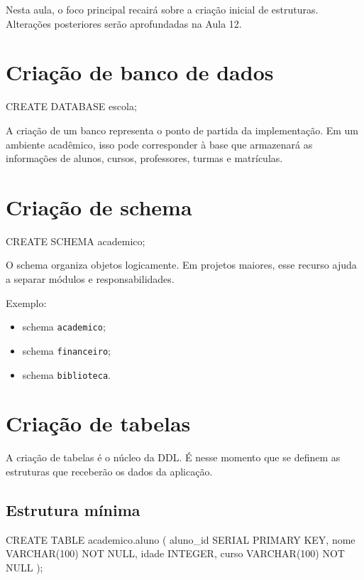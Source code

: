 Nesta aula, o foco principal recairá sobre a criação inicial de estruturas. Alterações posteriores serão aprofundadas na Aula 12.

\section{Criação de banco de dados}

\begin{sqlcode}
CREATE DATABASE escola;
\end{sqlcode}

A criação de um banco representa o ponto de partida da implementação. Em um ambiente acadêmico, isso pode corresponder à base que armazenará as informações de alunos, cursos, professores, turmas e matrículas.

\section{Criação de schema}

\begin{sqlcode}
CREATE SCHEMA academico;
\end{sqlcode}

O schema organiza objetos logicamente. Em projetos maiores, esse recurso ajuda a separar módulos e responsabilidades.

Exemplo:
\begin{itemize}
    \item schema \texttt{academico};
    \item schema \texttt{financeiro};
    \item schema \texttt{biblioteca}.
\end{itemize}

\section{Criação de tabelas}

A criação de tabelas é o núcleo da DDL. É nesse momento que se definem as estruturas que receberão os dados da aplicação.

\subsection{Estrutura mínima}

\begin{sqlcode}
CREATE TABLE academico.aluno (
    aluno_id SERIAL PRIMARY KEY,
    nome VARCHAR(100) NOT NULL,
    idade INTEGER,
    curso VARCHAR(100) NOT NULL
);
\end{sqlcode}

